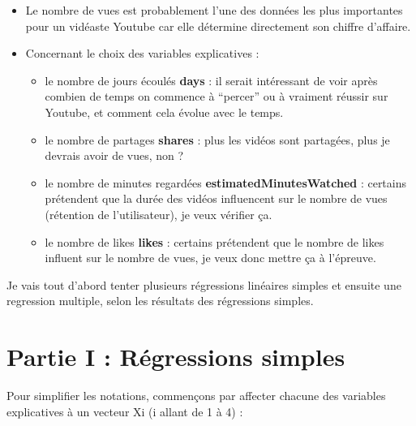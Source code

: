 \begin{itemize}
\tightlist
\item
  Le nombre de vues est probablement l'une des données les plus
  importantes pour un vidéaste Youtube car elle détermine directement
  son chiffre d'affaire.
\item
  Concernant le choix des variables explicatives :

  \begin{itemize}
  \tightlist
  \item
    le nombre de jours écoulés \textbf{days} : il serait intéressant de
    voir après combien de temps on commence à ``percer'' ou à vraiment
    réussir sur Youtube, et comment cela évolue avec le temps.
  \item
    le nombre de partages \textbf{shares} : plus les vidéos sont
    partagées, plus je devrais avoir de vues, non ?
  \item
    le nombre de minutes regardées \textbf{estimatedMinutesWatched} :
    certains prétendent que la durée des vidéos influencent sur le
    nombre de vues (rétention de l'utilisateur), je veux vérifier ça.
  \item
    le nombre de likes \textbf{likes} : certains prétendent que le
    nombre de likes influent sur le nombre de vues, je veux donc mettre
    ça à l'épreuve.
  \end{itemize}
\end{itemize}

Je vais tout d'abord tenter plusieurs régressions linéaires simples et
ensuite une regression multiple, selon les résultats des régressions
simples.

\newpage

\hypertarget{partie-i-ruxe9gressions-simples}{%
\section{Partie I : Régressions
simples}\label{partie-i-ruxe9gressions-simples}}

Pour simplifier les notations, commençons par affecter chacune des
variables explicatives à un vecteur Xi (i allant de 1 à 4) :

\begin{Schunk}
\end{Schunk}

